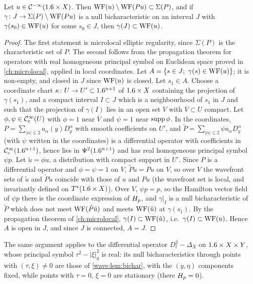 \begin{theorem}\label{wave:thm:propagation}
Let $u\in\mathcal{C}^{-\infty}(1.6\times X)$. Then $\operatorname{WF}(u)\setminus\operatorname{WF}(Pu)\subset\Sigma(P)$, and if
$\gamma\colon J\to\Sigma(P)\setminus\operatorname{WF}(Pu)$ is a null bicharacteristic on an interval $J$ with
$\gamma(s_0)\in\operatorname{WF}(u)$ for some $s_0\in J$, then $\gamma(J)\subset\operatorname{WF}(u)$.
\end{theorem}
\begin{proof}
The first statement is microlocal elliptic regularity, since $\Sigma(P)$ is the
characteristic set of $P$. The second follows from the propagation theorem for
operators with real homogeneous principal symbol on Euclidean space proved in
\cref{ch:microlocal}, applied in local coordinates. Let
$A=\{s\in J;\ \gamma(s)\in\WF(u)\}$; it is non-empty, and closed in $J$ since $\operatorname{WF}(u)$
is closed. Let $s_1\in A$. Choose a coordinate chart $\kappa\colon U\to U'\subset1.6^{n+1}$ of
$1.6\times X$ containing the projection of $\gamma(s_1)$, and a compact interval $I\subset J$
which is a neighbourhood of $s_1$ in $J$ and such that the projection of $\gamma(I)$ lies
in an open set $V$ with $\overline V\subset U$ compact. Let $\phi,\psi\in\mathcal{C}^\infty_{\mathrm{c}}(U)$ with
$\phi=1$ near $\overline V$ and $\psi=1$ near $\operatorname{supp}\phi$. In the coordinates,
$P=\sum_{|\alpha|\le2}a_\alpha(y)D_y^\alpha$ with smooth coefficients on $U'$, and
$\tilde P=\sum_{|\alpha|\le2}\psi a_\alpha D_y^\alpha$ (with $\psi$ written in the coordinates)
is a differential operator with coefficients in $\mathcal{C}^\infty_{\mathrm{c}}(1.6^{n+1})$, hence lies in
$\Psi^{2}(1.6^{n+1})$ and has real homogeneous principal symbol $\psi p$. Let
$\tilde u=\phi u$, a distribution with compact support in $U'$. Since $P$ is a
differential operator and $\phi=\psi=1$ on $V$, $\tilde P\tilde u=Pu$ on $V$, so over $V$
the wavefront sets of $\tilde u$ and $\tilde P\tilde u$ coincide with those of $u$ and $Pu$
(the wavefront set is local, and invariantly defined on $T^*(1.6\times X)$). Over $V$,
$\psi p=p$, so the Hamilton vector field of $\psi p$ there is the coordinate expression of
$H_{p}$, and $\gamma|_I$ is a null bicharacteristic of $\tilde P$ which does not meet
$\operatorname{WF}(\tilde P\tilde u)$ and meets $\operatorname{WF}(\tilde u)$ at $\gamma(s_1)$. By the propagation theorem of
\cref{ch:microlocal}, $\gamma(I)\subset\operatorname{WF}(\tilde u)$, i.e.\ $\gamma(I)\subset\operatorname{WF}(u)$. Hence $A$ is
open in $J$, and since $J$ is connected, $A=J$.
\end{proof}

The same argument applies to the differential operator $D_t^2-\Delta_X$ on $1.6\times X\times Y$, whose
principal symbol $\tau^2-|\xi|_g^2$ is real: its null bicharacteristics through points with
$(\tau,\xi)\ne0$ are those of \cref{wave:lem:bichar}, with the $(y,\eta)$ components fixed, while
points with $\tau=0$, $\xi=0$ are stationary (there $H_{p}=0$).

